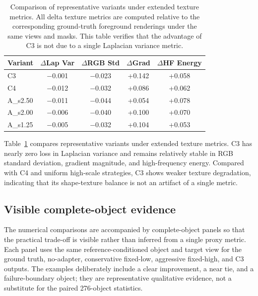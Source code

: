 \documentclass[times,twocolumn,final]{elsarticle}
\begin{document}
\begin{table}[h!]
\centering
\caption{Comparison of representative variants under extended texture metrics. All delta texture metrics are computed relative to the corresponding ground-truth foreground renderings under the same views and masks. This table verifies that the advantage of C3 is not due to a single Laplacian variance metric.}
\label{tab:extended}
\small
\begin{tabular}{lcccc}
\toprule
Variant & $\Delta$Lap Var & $\Delta$RGB Std & $\Delta$Grad & $\Delta$HF Energy \\
\midrule
C3 & $-$0.001 & $-$0.023 & +0.142 & +0.058 \\
C4 & $-$0.012 & $-$0.032 & +0.086 & +0.062 \\
A\_s2.50 & $-$0.011 & $-$0.044 & +0.054 & +0.078 \\
A\_s2.00 & $-$0.006 & $-$0.040 & +0.100 & +0.070 \\
A\_s1.25 & $-$0.005 & $-$0.032 & +0.104 & +0.053 \\
\bottomrule
\end{tabular}
\end{table}

Table~\ref{tab:extended} compares representative variants under extended texture metrics. C3 has nearly zero loss in Laplacian variance and remains relatively stable in RGB standard deviation, gradient magnitude, and high-frequency energy. Compared with C4 and uniform high-scale strategies, C3 shows weaker texture degradation, indicating that its shape-texture balance is not an artifact of a single metric.

\FloatBarrier

\fi
\subsection{Visible complete-object evidence}
\label{subsec:visual}

The numerical comparisons are accompanied by complete-object panels so that
the practical trade-off is visible rather than inferred from a single proxy
metric. Each panel uses the same reference-conditioned object and target view
for the ground truth, no-adapter, conservative fixed-low, aggressive
fixed-high, and C3 outputs. The examples deliberately include a clear
improvement, a near tie, and a failure-boundary object; they are representative
qualitative evidence, not a substitute for the paired 276-object statistics.
\end{document}
